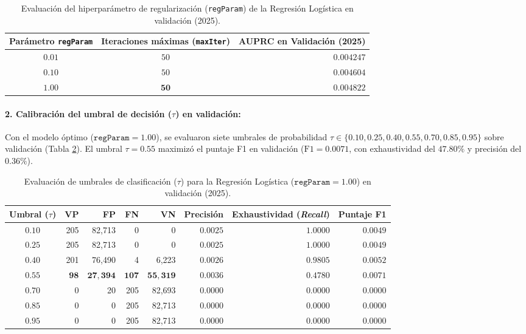 \begin{table}[H]
\centering
\small
\renewcommand{\arraystretch}{1.2}
\caption{Evaluación del hiperparámetro de regularización (\texttt{regParam}) de la Regresión Logística en validación (2025).}
\label{tab:lr_regparam}
\begin{tabular}{c c r}
\toprule
\textbf{Parámetro \texttt{regParam}} & \textbf{Iteraciones máximas (\texttt{maxIter})} & \textbf{AUPRC en Validación (2025)} \\
\midrule
$0.01$ & $50$ & $0.004247$ \\
$0.10$ & $50$ & $0.004604$ \\
$\mathbf{1.00}$ & $\mathbf{50}$ & $\mathbf{0.004822}$ \\
\bottomrule
\end{tabular}
\end{table}

\paragraph{2. Calibración del umbral de decisión ($\tau$) en validación:}
Con el modelo óptimo ($\texttt{regParam} = 1.00$), se evaluaron siete umbrales de probabilidad $\tau \in \{0.10, 0.25, 0.40, 0.55, 0.70, 0.85, 0.95\}$ sobre validación (Tabla \ref{tab:lr_umbrales_val}). El umbral $\tau = 0.55$ maximizó el puntaje F1 en validación ($\text{F1} = 0.0071$, con exhaustividad del $47.80\%$ y precisión del $0.36\%$).

\begin{table}[H]
\centering
\small
\renewcommand{\arraystretch}{1.2}
\caption{Evaluación de umbrales de clasificación ($\tau$) para la Regresión Logística ($\texttt{regParam}=1.00$) en validación (2025).}
\label{tab:lr_umbrales_val}
\begin{tabular}{c r r r r r r r}
\toprule
\textbf{Umbral ($\tau$)} & \textbf{VP} & \textbf{FP} & \textbf{FN} & \textbf{VN} & \textbf{Precisión} & \textbf{Exhaustividad (\textit{Recall})} & \textbf{Puntaje F1} \\
\midrule
$0.10$ & 205 & 82,713 & 0 & 0 & $0.0025$ & $1.0000$ & $0.0049$ \\
$0.25$ & 205 & 82,713 & 0 & 0 & $0.0025$ & $1.0000$ & $0.0049$ \\
$0.40$ & 201 & 76,490 & 4 & 6,223 & $0.0026$ & $0.9805$ & $0.0052$ \\
$\mathbf{0.55}$ & $\mathbf{98}$ & $\mathbf{27,394}$ & $\mathbf{107}$ & $\mathbf{55,319}$ & $\mathbf{0.0036}$ & $\mathbf{0.4780}$ & $\mathbf{0.0071}$ \\
$0.70$ & 0 & 20 & 205 & 82,693 & $0.0000$ & $0.0000$ & $0.0000$ \\
$0.85$ & 0 & 0 & 205 & 82,713 & $0.0000$ & $0.0000$ & $0.0000$ \\
$0.95$ & 0 & 0 & 205 & 82,713 & $0.0000$ & $0.0000$ & $0.0000$ \\
\bottomrule
\end{tabular}
\end{table}

